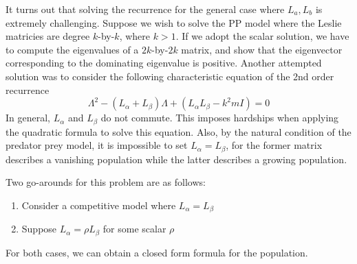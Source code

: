 \documentclass{article}
\begin{document}
\vspace{5mm}

It turns out that solving the recurrence for the general case 
where $L_a, L_b$ is extremely challenging. Suppose we wish to 
solve the PP model where the Leslie matricies are degree $k$-by-$k$, 
where $k > 1$. If we adopt the scalar solution, we have to compute 
the eigenvalues of a $2k$-by-$2k$ matrix, and show that the eigenvector 
corresponding to the dominating eigenvalue is positive. Another 
attempted solution was to consider the following characteristic equation of 
the 2nd order recurrence
\[
    \Lambda^2 - (L_\alpha + L_\beta) \Lambda + (L_\alpha L_\beta - k^2 m I) = 0
\]
In general, $L_\alpha$ and $L_\beta$ do not commute. This imposes 
hardships when applying the quadratic formula to solve this equation.
Also, by the natural condition of the predator prey model, it is impossible 
to set $L_\alpha = L_\beta$, for the former matrix describes a vanishing 
population while the latter describes a growing population.  

Two go-arounds for this problem are as follows:
\begin{enumerate}
    \item Consider a competitive model where $L_\alpha = L_\beta$
    \item Suppose $L_\alpha = \rho L_\beta$ for some scalar $\rho$
\end{enumerate}

For both cases, we can obtain a closed form formula for the population. 
\end{document}
